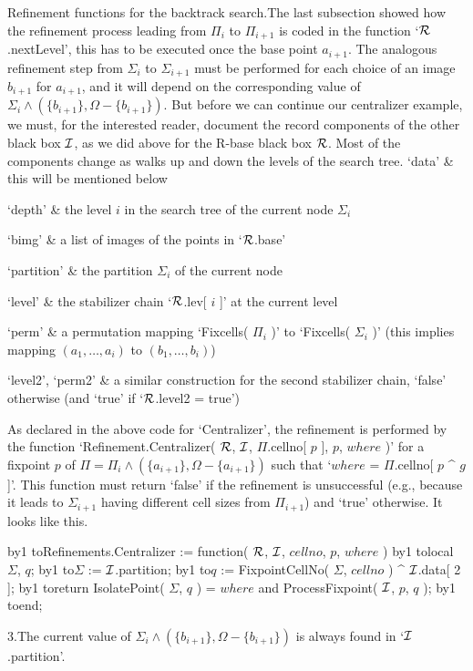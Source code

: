 \medskip%
{\bsf Refinement functions    for the backtrack   search.}\quad  The last
subsection   showed how the refinement  process   leading from $\Pi_i$ to
$\Pi_{i+1}$ is coded in the function `$\cal R$.nextLevel', this has to be
executed once the base point   $a_{i+1}$. The analogous refinement   step
from $\Sigma_i$ to $\Sigma_{i+1}$ must be performed for each choice of an
image  $b_{i+1}$ for $a_{i+1}$, and it  will depend  on the corresponding
value of  $\Sigma_i\wedge (\{b_{i+1}\},  \Omega-\{b_{i+1}\})$. But before
we can  continue  our centralizer example,   we must, for the  interested
reader, document the  record components of the  other black box $\cal I$,
as we did above for the R-base black box $\cal R$. Most of the components
change as {\GAP} walks up and down the levels of the search tree.
\beginitems
`data' &
    this will be mentioned below

`depth' &
    the level $i$ in the search tree of the current node $\Sigma_i$

`bimg' &
    a list of images of the points in `$\cal R$.base'

`partition' &
    the partition $\Sigma_i$ of the current node

`level' &
    the stabilizer chain `$\cal R$.lev[ $i$ ]' at the current level

`perm' &
    a permutation mapping `Fixcells(  $\Pi_i$ )' to `Fixcells( $\Sigma_i$
    )' (this implies mapping $(a_1,\ldots,a_i)$ to $(b_1,\ldots,b_i)$)

`level2', `perm2' &
    a  similar construction for    the second stabilizer chain,   `false'
    otherwise (and `true' if `$\cal R$.level2 = true')
\enditems

As declared  in   the above code  for `Centralizer',   the refinement  is
performed by  the function `Refinement.Centralizer(  $\cal R$,  $\cal I$,
$\Pi$.cellno[ $p$ ], $p$,  $where$ )' for a fixpoint  $p$ of $\Pi=  \Pi_i
\wedge    (\{a_{i+1}\}, \Omega-\{a_{i+1}\})$   such    that   `$where$  =
$\Pi$.cellno[ $p$  ^  $g$ ]'. This function   must return `false' if  the
refinement  is  unsuccessful (e.g., because   it  leads to $\Sigma_{i+1}$
having  different cell sizes from $\Pi_{i+1}$)   and `true' otherwise. It
looks like this.

{\parskip 0pt \newcount\lineno%
 \def\){\advance\lineno by1 \begingroup\obeylines\cloparen%
        \hbox to\manindent{\hfil $\scriptstyle\the\lineno$\enspace}}%
\)Refinements.Centralizer := function( $\cal R$, $\cal I$, %
                                       $cellno$, $p$, $where$ )
\)local \ $\Sigma$,  $q$;
\)\quad $\Sigma$ := $\cal I$.partition;
\)\quad $q$ := FixpointCellNo( $\Sigma$, $cellno$ ) ^ $\cal I$.data[ 2 ];
\)\quad return IsolatePoint( $\Sigma$, $q$ ) = $where$ %
           and ProcessFixpoint( $\cal I$, $p$, $q$ );
\)end;
  \vadjust{\allowbreak}%

}%
3.\enspace    The  current    value   of   $\Sigma_i\wedge  (\{b_{i+1}\},
\Omega-\{b_{i+1}\})$ is always found in `$\cal I$.partition'.

